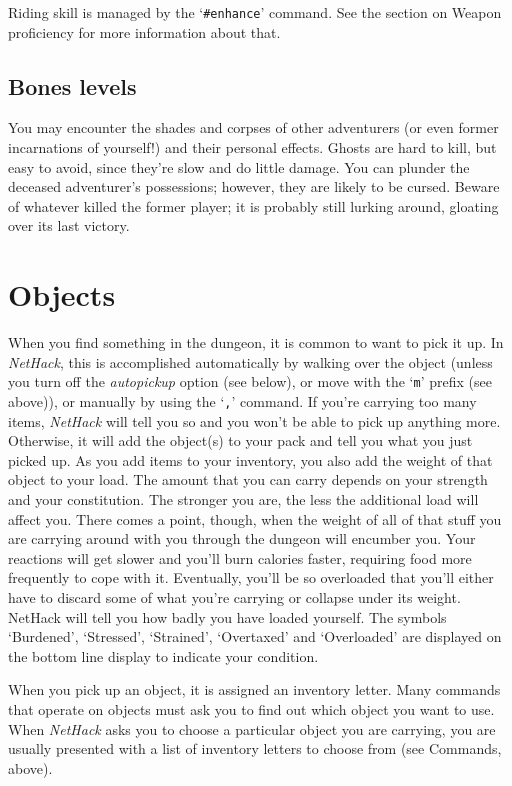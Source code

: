 Riding skill is managed by the `{\tt \#enhance}' command.  See the section
on Weapon proficiency for more information about that.

\subsection*{Bones levels}

You may encounter the shades and corpses of other adventurers (or even
former incarnations of yourself!) and their personal effects.  Ghosts
are hard to kill, but easy to avoid, since they're slow and do little
damage.  You can plunder the deceased adventurer's possessions;
however, they are likely to be cursed.  Beware of whatever killed the
former player; it is probably still lurking around, gloating over its
last victory.

\section{Objects}

When you find something in the dungeon, it is common to want to pick
it up.  In {\it NetHack}, this is accomplished automatically by walking over
the object (unless you turn off the {\it autopickup\/}
option (see below), or move with the `{\tt m}' prefix (see above)), or
manually by using the `{\tt ,}' command.
If you're carrying too many items, {\it NetHack\/} will tell you so and you
won't be able to pick up anything more.  Otherwise, it will add the object(s)
to your pack and tell you what you just picked up.
As you add items to your inventory, you also add the weight of that object
to your load.  The amount that you can carry depends on your strength and
your constitution.  The
stronger you are, the less the additional load will affect you.  There comes
a point, though, when the weight of all of that stuff you are carrying around
with you through the dungeon will encumber you.  Your reactions
will get slower and you'll burn calories faster, requiring food more frequently
to cope with it.  Eventually, you'll be so overloaded that you'll either have
to discard some of what you're carrying or collapse under its weight.
NetHack will tell you how badly you have loaded yourself.  The symbols
`Burdened', `Stressed', `Strained', `Overtaxed' and `Overloaded' are
displayed on the bottom line display to indicate your condition.

When you pick up an object, it is assigned an inventory letter.  Many
commands that operate on objects must ask you to find out which object
you want to use.  When {\it NetHack\/} asks you to choose a particular object
you are carrying, you are usually presented with a list of inventory
letters to choose from (see Commands, above).

